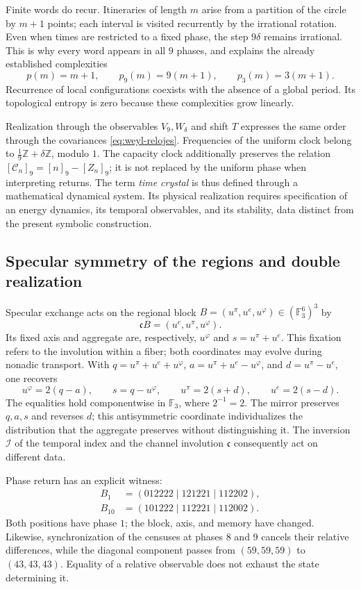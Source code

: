 Finite words do recur. Itineraries of length \(m\)
arise from a partition of the circle by \(m+1\) points; each
interval is visited recurrently by the irrational rotation. Even
when times are restricted to a fixed phase, the step \(9\delta\) remains
irrational. This is why every word appears in all
\(9\) phases, and explains the already established complexities
\[
 p(m)=m+1,\qquad p_9(m)=9(m+1),\qquad p_3(m)=3(m+1).
\]
Recurrence of local configurations coexists with the absence of a
global period. Its topological entropy is zero because these complexities
grow linearly.

Realization through the observables \(V_9,W_\delta\) and shift
\(T\) expresses the same order through the covariances
\eqref{eq:weyl-relojes}. Frequencies of the uniform clock belong to
\(\frac19\mathbb Z+\delta\mathbb Z\), modulo \(1\). The capacity clock
additionally preserves the relation
\([\mathcal C_n]_9=[n]_9-[Z_n]_9\); it is not replaced by the uniform phase
when interpreting returns. The term \emph{time crystal} is thus
defined through a mathematical dynamical system. Its physical realization
requires specification of an energy dynamics, its temporal observables,
and its stability, data distinct from the present symbolic construction.

\subsection{Specular symmetry of the regions and double realization}
\label{mono-ampl:regiones}

Specular exchange acts on the regional block
\(B=(u^\pi,u^e,u^\varphi)\in(\mathbb F_3^6)^3\) by
\[
 \mathfrak cB=(u^e,u^\pi,u^\varphi).
\]
Its fixed axis and aggregate are, respectively, \(u^\varphi\) and
\(s=u^\pi+u^e\). This fixation refers to the involution within a fiber;
both coordinates may evolve during nonadic transport.
With \(q=u^\pi+u^e+u^\varphi\),
\(a=u^\pi+u^e-u^\varphi\), and \(d=u^\pi-u^e\), one recovers
\[
 u^\varphi=2(q-a),\qquad s=q-u^\varphi,\qquad
 u^\pi=2(s+d),\qquad u^e=2(s-d).
\]
The equalities hold componentwise in \(\mathbb F_3\), where
\(2^{-1}=2\). The mirror preserves \(q,a,s\) and reverses \(d\); this
antisymmetric coordinate individualizes the distribution that the aggregate preserves
without distinguishing it. The inversion \(\mathcal I\) of the temporal index and the
channel involution \(\mathfrak c\) consequently act on
different data.

Phase return has an explicit witness:
\[
 \begin{aligned}
 B_1&=(012222\mid121221\mid112202),\\
 B_{10}&=(101222\mid112221\mid112002).
 \end{aligned}
\]
Both positions have phase \(1\); the block, axis, and memory have
changed. Likewise, synchronization of the censuses at phases \(8\) and
\(9\) cancels their relative differences, while the diagonal component
passes from \((59,59,59)\) to \((43,43,43)\). Equality of a relative
observable does not exhaust the state determining it.


